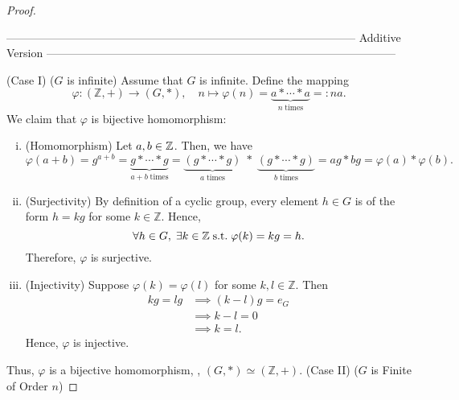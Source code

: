 \documentclass[11pt,openany]{article}
\begin{document}
\begin{proof}
\begin{center}
	\ttfamily --------------------------------------------------------------------------------------------- Additive Version ---------------------------------------------------------------------------------------------
\end{center}
(Case I) ($G$ is infinite) Assume that $G$ is infinite.
Define the mapping \[
\varphi : (\mathbb{Z}, +) \to (G, \ast),\quad n\mapsto \varphi(n) = \underbrace{a\ast\cdots\ast a}_{n\; \text{times}}=: na.
\] We claim that $\varphi$ is bijective homomorphism: \begin{enumerate}[(i)]
	\item (Homomorphism)\;  Let $a,b\in\mathbb{Z}$. Then, we have \[
	\varphi(a+b)=g^{a+b}=\underbrace{g\ast\cdots\ast g}_{a+b\; \text{times}}=\underbrace{(g\ast\cdots\ast g)}_{a\; \text{times}}\;\ast\;\underbrace{(g\ast\cdots\ast g)}_{b\; \text{times}}=ag\ast bg = \varphi(a)\ast\varphi(b).
	\]
	\item (Surjectivity)\; By definition of a cyclic group, every element \(h\in G\) is of the form \(h=kg\) for some \(k\in \mathbb{Z}\). Hence, \[
	\forall h\in G,\; \exists k\in\mathbb{Z}\; \text{s.t.}\; \varphi(k)=kg = h.
	\] Therefore, \(\varphi\) is surjective.
	\item (Injectivity)\; Suppose \(\varphi(k)=\varphi(l)\) for some \(k,l\in \mathbb{Z}\). Then \begin{align*}
		kg=lg&\implies (k-l)g=e_G\\
		&\implies k-l=0\\
		&\implies k=l.
	\end{align*}
	Hence, \(\varphi\) is injective.
\end{enumerate}
Thus, \(\varphi\) is a bijective homomorphism, \ie, $(G,\ast) \simeq (\mathbb{Z},+)$.
\newpage\noindent
(Case II)\; (\(G\) is Finite of Order \(n\))


\end{proof}
\end{document}
